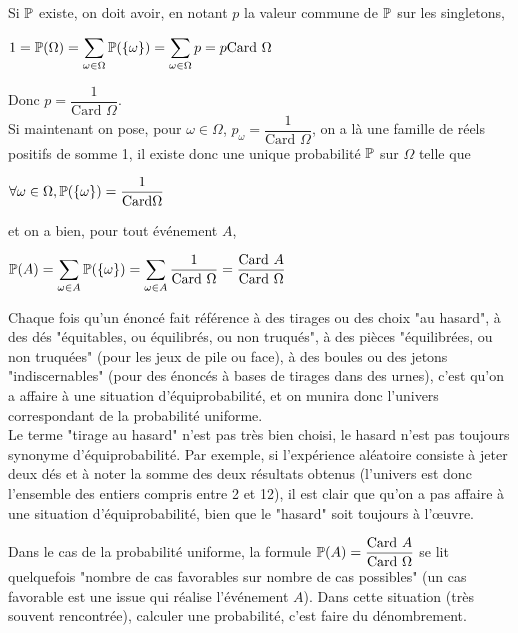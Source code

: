 \documentclass[12pt,a4paper]{report}
\begin{document}
\begin{demo}{}
Si $\mathbb{P}$ existe, on doit avoir, en notant $p$ la valeur commune de $\mathbb{P}$ sur les singletons,
\begin{center}
$1 = \mathbb{P}(\Omega) = \displaystyle \sum_{\omega \in \Omega} \mathbb{P}(\{\omega\}) = \sum_{\omega \in \Omega} p = p \text{Card } \Omega$
\end{center}
Donc $p = \dfrac{1}{\text{Card } \Omega}$. \\

Si maintenant on pose, pour $\omega \in \Omega$, $p_\omega = \dfrac{1}{\text{Card } \Omega}$, on a là une famille de réels positifs de somme 1, il existe donc une 
unique probabilité $\mathbb{P}$ sur $\Omega$ telle que
\begin{center}
$\forall \omega \in \Omega, \mathbb{P}(\{\omega\}) = \dfrac{1}{\text{Card} \Omega}$
\end{center}
et on a bien, pour tout événement $A$,
\begin{center}
$\mathbb{P}(A) = \displaystyle \sum_{\omega \in A} \mathbb{P}(\{\omega\}) = \sum_{\omega \in A} \dfrac{1}{\text{Card } \Omega} = \dfrac{\text{Card } A}{\text{Card } \Omega}$
\end{center}
\end{demo}

\begin{remarque}{}
Chaque fois qu'un énoncé fait référence à des tirages ou des choix "au hasard", à des dés "équitables, ou équilibrés, ou non truqués", à des pièces "équilibrées, ou 
non truquées" (pour les jeux de pile ou face), à des boules ou des jetons "indiscernables" (pour des énoncés à bases de tirages dans des urnes), c'est qu'on a affaire 
à une situation d'équiprobabilité, et on munira donc l'univers correspondant de la probabilité uniforme. \\

Le terme "tirage au hasard" n'est pas très bien choisi, le hasard n'est pas toujours synonyme d'équiprobabilité. Par exemple, si l'expérience aléatoire consiste à 
jeter deux dés et à noter la somme des deux résultats obtenus (l'univers est donc l'ensemble des entiers compris entre 2 et 12), il est clair que qu'on a pas affaire 
à une situation d'équiprobabilité, bien que le "hasard" soit toujours à l'œuvre.
\end{remarque}

\begin{remarque}{}
Dans le cas de la probabilité uniforme, la formule $\mathbb{P}(A) = \dfrac{\text{Card } A}{\text{Card } \Omega}$ se lit quelquefois "nombre de cas favorables sur nombre de 
cas possibles" (un cas favorable est une issue qui réalise l'événement $A$). Dans cette situation (très souvent rencontrée), calculer une probabilité, c'est faire du 
dénombrement.
\end{remarque}
\end{document}

